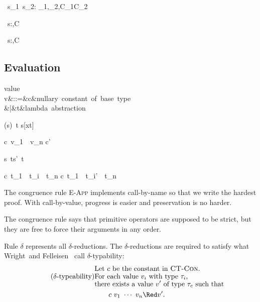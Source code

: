 \documentclass{amsart}
\theoremstyle{definition}
\begin{document}
{\Gamma\vdash\Add~s_1~s_2:
\Int\Given\sigma_1\Sub\Int,\sigma_2\Sub\Int,C_1\cup C_2}

{\Gamma\vdash\If~s:\alpha\R\alpha\R\alpha\Given\sigma\Sub\Bool,C}

{\Gamma\vdash\Fix~s:\alpha\Given\sigma\Sub \alpha\R\alpha,C}

\subsection{Evaluation}
\label{eval}

\begin{syntax}
\mbox{value}\\
v&::=&c&\mbox{nullary constant of base type}\\
&|&t&\mbox{lambda abstraction}
\end{syntax}

\infrule[$\beta$]
{}
{(s)~t \Red s[x\mapsto t]}

\infrule[$\delta$]
{}
{c~v_1~\cdots~v_n \Red c'}

{s~t\Red s'~t}

{c~t_1~\cdots~t_i~\cdots~t_n
\Red
c~t_1~\cdots~t_i'~\cdots~t_n
}

The congruence rule \textsc{E-App} implements call-by-name so
that we write the hardest proof. With call-by-value, progress is
easier and preservation is no harder.

The congruence rule  says that primitive operators
are supposed to be strict, but they are free to force their
arguments in any order.

Rule \textsc{$\delta$} represents all $\delta$-reductions. The
$\delta$-reductions are required to satisfy what
Wright~and Felleisen~\cite{Wright94} call $\delta$-typability:
\begin{align*}
&\text{Let $c$ be the constant in \textsc{CT-Con}.}\\[-4pt]
\tag{$\delta$-typeability}\label{delta-typability}
&\text{For each value $v_i$ with type $\tau_i$,}\\[-4pt]
&\text{there exists a value $v'$ of type $\tau_c$ such that}\\
&\hspace{2em}c~v_1~\cdots~v_n\Red v'.
\end{align*}
\end{document}
